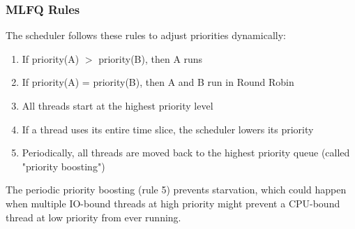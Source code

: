 \documentclass[../../compsys.tex]{subfiles}
\begin{document}
\subsubsection{MLFQ Rules}
The scheduler follows these rules to adjust priorities dynamically:
\begin{enumerate}
    \item If priority(A) $>$ priority(B), then A runs
    \item If priority(A) = priority(B), then A and B run in Round Robin
    \item All threads start at the highest priority level
    \item If a thread uses its entire time slice, the scheduler lowers its priority
    \item Periodically, all threads are moved back to the highest priority queue (called "priority boosting")
\end{enumerate}

The periodic priority boosting (rule 5) prevents starvation, which could happen when multiple IO-bound threads at high priority might prevent a CPU-bound thread at low priority from ever running.
\end{document}
